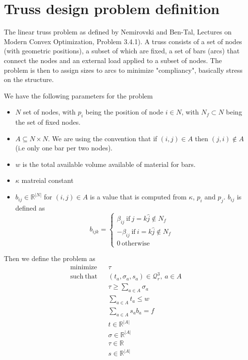 \documentclass{article}
\begin{document}
\section{Truss design problem definition}

The linear truss problem as defined by Nemirovski and Ben-Tal,
Lectures on Modern Convex Optimization, Problem 3.4.1). A truss consists of a
set of nodes (with geometric positions), a subset of which are fixed, a set of
bars (arcs) that connect
the nodes and an external load applied to a subset of nodes. The problem is
then to assign sizes to arcs to minimize "compliancy", basically stress on the
structure.

We have the following parameters for the problem
\begin{itemize}
\item $N$ set of nodes, with $p_i$ being the position of node $i\in N$, with $N_f\subset N$ being the set of fixed nodes.
\item $A\subseteq N\times N$. We are using the convention that if $(i,j)\in A$
    then $(j,i)\not\in A$ (i.e only one bar per two nodes). 
\item $w$ is the total available volume available of material for bars.
\item $\kappa$ matreial constant
\item $b_{ij}\in\mathbb{R}^{|N|}$ for $(i,j)\in A$ is a value that is computed from $\kappa$, $p_i$ and $p_j$. $b_{ij}$ is defined as 
    \[
        b_{ijk} = \left\{ 
            \begin{array}{l}
                \beta_{ij}\ \mathrm{ if }\ j = k\hat j\not\in N_f \\
                -\beta_{ij}\ \mathrm{ if }\ i = k\hat j\not\in N_f \\
                0\  \mathrm{ otherwise}
            \end{array}
        \right.
    \]
\end{itemize}
Then we define the problem as 
\begin{eqnarray}
    \mathrm{minimize} &&  \tau \\
    \mathrm{such\ that} 
    && (t_a,\sigma_a,s_a)\in\mathcal{Q}^3_r,\ a\in A\\
    && \tau \geq \sum_{a\in A} \sigma_a \\
    && \sum_{a\in A} t_a \leq w \\
    && \sum_{a\in A} s_a b_a = f \\
    && t\in\mathbb{R}^{|A|}\\
    && \sigma\in\mathbb{R}^{|A|} \\
    && \tau\in\mathbb{R}\\
    && s\in\mathbb{R}^{|A|} 
\end{eqnarray}
\end{document}
